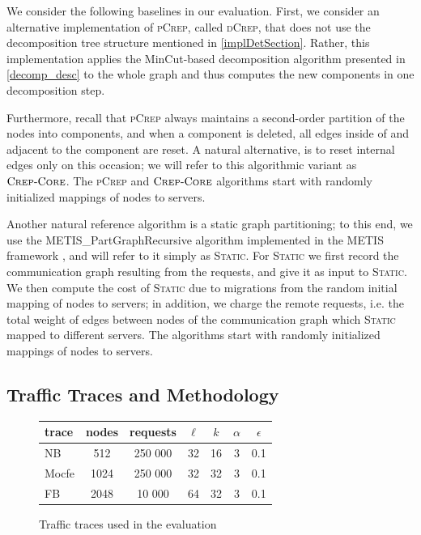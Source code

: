 \documentclass[a4paper,UKenglish,cleveref, autoref, thm-restate,authorcolumns]{../lipics/lipics-v2019}
\newcommand{\adjDel}{\textsc{pCrep}}
\newcommand{\static}{\textsc{Static}}
\newcommand{\directDecomp}{\textsc{dCrep}}
\newcommand{\coreDel}{\text{C{\scriptsize REP}-C{\scriptsize ORE}}}
\newcommand{\fb}{FB}
\newcommand{\dbmocfe}{Mocfe}
\newcommand{\dbnekbone}{NB}
\begin{document}
We consider the following baselines in our evaluation.
First, we consider an alternative implementation 
of \adjDel{}, called \directDecomp{}, that does not use the decomposition tree 
	structure mentioned in \cref{implDetSection}.
	Rather, this implementation 
	applies the MinCut-based decomposition algorithm presented in \cref{decomp_desc}
	to the whole graph and thus computes the new components in one decomposition step.

Furthermore, recall that \adjDel{} always maintains a second-order partition of the nodes 
into components, and when a component is deleted, all edges inside of and adjacent to the component are reset. 
A natural alternative, is to reset internal edges only on this occasion;
we will refer to this algorithmic variant as $\coreDel$.
The \adjDel{} and $\coreDel$ 
algorithms start with randomly initialized mappings of nodes to servers.

Another natural reference algorithm is a static graph partitioning;
to this end, we use the METIS\_PartGraphRecursive algorithm 
implemented in the METIS framework \cite{Karypis1998, Karypis1998a},
and will refer to it simply as \static{}. %
For \static{} we first record the communication graph resulting
from the requests, and give it as input to \static{}. 
We then compute the cost of \static{} due to migrations from the random initial mapping of nodes to servers; in addition, we charge 
the remote requests, i.e. the total weight of edges between nodes of the communication graph which \static{} mapped to different servers.
The algorithms start with randomly initialized mappings of nodes to servers.

\subsection{Traffic Traces and Methodology}
\label{inputDesc}

\begin{figure}
	\begin{center}
		\begin{tabular}{|l|c|c|c|c|c|c|}
			\hline
			trace & nodes & requests & $\ell$ & $k$ & $\alpha$ & $\epsilon$\\
			\hline
			\dbnekbone{} & 512 & 250 000 & 32 & 16 & 3 & 0.1 \\
			\dbmocfe{} & 1024 & 250 000 & 32 & 32 & 3 & 0.1 \\
			\fb{} & 2048 & 10 000 & 64 & 32 & 3 & 0.1 \\
			\hline
		\end{tabular}
	\end{center}
	\caption{Traffic traces used in the evaluation}
	\label{fig:trace_overview}
\end{figure}
\end{document}
